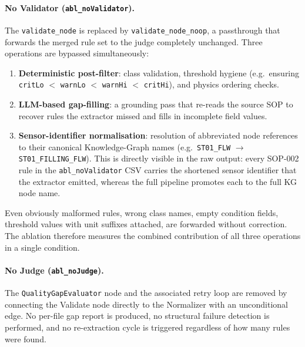 ﻿\documentclass[11pt]{article}
\begin{document}
\paragraph{No Validator (\texttt{abl\_noValidator}).}
The \texttt{validate\_node} is replaced by \texttt{validate\_node\_noop}, a
passthrough that forwards the merged rule set to the judge completely unchanged.
Three operations are bypassed simultaneously:
\begin{enumerate}
    \item \textbf{Deterministic post-filter}: class validation, threshold hygiene
          (e.g.\ ensuring \texttt{critLo} $<$ \texttt{warnLo} $<$ \texttt{warnHi}
          $<$ \texttt{critHi}), and physics ordering checks.
    \item \textbf{LLM-based gap-filling}: a grounding pass that re-reads the source
          SOP to recover rules the extractor missed and fills in incomplete field
          values.
    \item \textbf{Sensor-identifier normalisation}: resolution of abbreviated node
          references to their canonical Knowledge-Graph names (e.g.\
          \texttt{ST01\_FLW} $\to$ \texttt{ST01\_FILLING\_FLW}).  This is directly
          visible in the raw output: every SOP-002 rule in the \texttt{abl\_noValidator}
          CSV carries the shortened sensor identifier that the extractor emitted,
          whereas the full pipeline promotes each to the full KG node name.
\end{enumerate}
Even obviously malformed rules, wrong class names, empty condition fields,
threshold values with unit suffixes attached, are forwarded without correction.
The ablation therefore measures the combined contribution of all three operations
in a single condition.

\paragraph{No Judge (\texttt{abl\_noJudge}).}
The \texttt{QualityGapEvaluator} node and the associated retry loop are removed
by connecting the Validate node directly to the Normalizer with an unconditional
edge.  No per-file gap report is produced, no structural failure detection is
performed, and no re-extraction cycle is triggered regardless of how many rules
were found.

\end{document}
